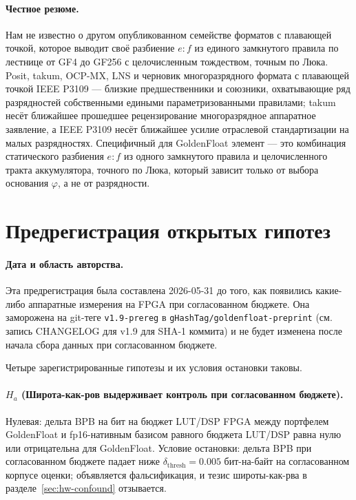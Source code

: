 \documentclass[11pt,a4paper]{article}
\theoremstyle{plain}
\begin{document}
\paragraph{Честное резюме.}
Нам не известно о другом опубликованном семействе форматов с плавающей точкой,
которое выводит своё разбиение \(e:f\) из единого замкнутого правила по лестнице
от GF4 до GF256 с целочисленным тождеством, точным по Люка. Posit, takum,
OCP-MX, LNS и черновик многоразрядного формата с плавающей точкой IEEE P3109 ---
близкие предшественники и союзники, охватывающие ряд разрядностей собственными
едиными параметризованными правилами; takum несёт ближайшее прошедшее
рецензирование многоразрядное аппаратное заявление, а IEEE P3109 несёт ближайшее
усилие отраслевой стандартизации на малых разрядностях. Специфичный для
GoldenFloat элемент --- это комбинация статического разбиения \(e:f\) из одного
замкнутого правила и целочисленного тракта аккумулятора, точного по Люка, который
зависит только от выбора основания \(\varphi\), а не от разрядности.

\section{Предрегистрация открытых гипотез}\label{sec:prereg}

\paragraph{Дата и область авторства.}
Эта предрегистрация была составлена 2026-05-31 до того, как появились
какие-либо аппаратные измерения на FPGA при согласованном бюджете. Она заморожена на
git-теге \texttt{v1.9-prereg} в \texttt{gHashTag/goldenfloat-preprint}
(см. запись CHANGELOG для v1.9 для SHA-1 коммита) и не будет изменена после
начала сбора данных при согласованном бюджете.

Четыре зарегистрированные гипотезы и их условия остановки таковы.

\paragraph{$H_a$ (Широта-как-ров выдерживает контроль при согласованном бюджете).}
Нулевая: дельта BPB на бит на бюджет LUT/DSP FPGA между портфелем GoldenFloat и
fp16-нативным базисом равного бюджета LUT/DSP равна нулю или отрицательна
для GoldenFloat. Условие остановки: дельта BPB при согласованном бюджете падает
ниже \(\delta_{\text{thresh}} = 0.005\) бит-на-байт на согласованном корпусе
оценки; объявляется фальсификация, и тезис широты-как-рва в
разделе~\ref{sec:hw-confound} отзывается.
\end{document}
